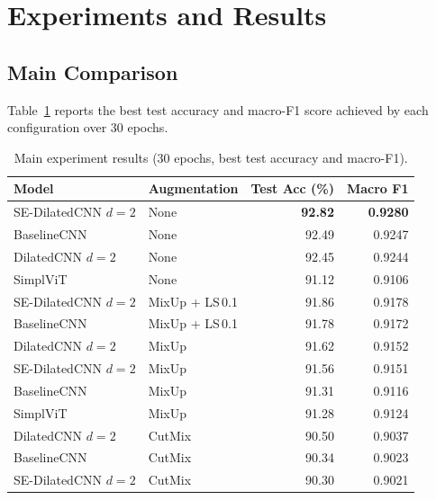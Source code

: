 \documentclass[10pt,a4paper]{article}
\begin{document}
\section{Experiments and Results}

\subsection{Main Comparison}

Table~\ref{tab:main} reports the best test accuracy and macro-F1 score achieved by each configuration over 30 epochs.

\begin{table}[H]
  \centering
  \caption{Main experiment results (30 epochs, best test accuracy and macro-F1).}
  \label{tab:main}
  \begin{tabular}{llrr}
    \toprule
    \textbf{Model} & \textbf{Augmentation} & \textbf{Test Acc (\%)} & \textbf{Macro F1} \\
    \midrule
    SE-DilatedCNN $d=2$ & None            & \textbf{92.82} & \textbf{0.9280} \\
    BaselineCNN         & None            & 92.49 & 0.9247 \\
    DilatedCNN $d=2$    & None            & 92.45 & 0.9244 \\
    SimplViT            & None            & 91.12 & 0.9106 \\
    \midrule
    SE-DilatedCNN $d=2$ & MixUp + LS\,0.1 & 91.86 & 0.9178 \\
    BaselineCNN         & MixUp + LS\,0.1 & 91.78 & 0.9172 \\
    DilatedCNN $d=2$    & MixUp           & 91.62 & 0.9152 \\
    SE-DilatedCNN $d=2$ & MixUp           & 91.56 & 0.9151 \\
    BaselineCNN         & MixUp           & 91.31 & 0.9116 \\
    SimplViT            & MixUp           & 91.28 & 0.9124 \\
    \midrule
    DilatedCNN $d=2$    & CutMix          & 90.50 & 0.9037 \\
    BaselineCNN         & CutMix          & 90.34 & 0.9023 \\
    SE-DilatedCNN $d=2$ & CutMix          & 90.30 & 0.9021 \\
    \bottomrule
  \end{tabular}
\end{table}
\end{document}

